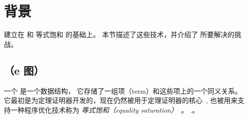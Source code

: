 \section{背景}
\label{sec:background}


\egg 建立在 \egraphs 和 等式饱和 的基础上。
  本节描述了这些技术，并介绍了 \egg 所要解决的挑战。



\subsection{\Egraphs （e 图）}
\label{sec:egraphs}

一个 \textit{\egraph} 是一个数据结构，
  它存储了一组项（term）和这些项上的一个同义关系。
它最初是为定理证明器开发的，现在仍然被用于定理证明器的核心~\cite{nelson, simplify, z3},
  \egraphs 也被用来支持一种程序优化技术称为 \textit{等式饱和（equality saturation）}~。
  \cite{denali, eqsat, eqsat-llvm, szalinski, yogo-pldi20, spores, herbie}.。
  
